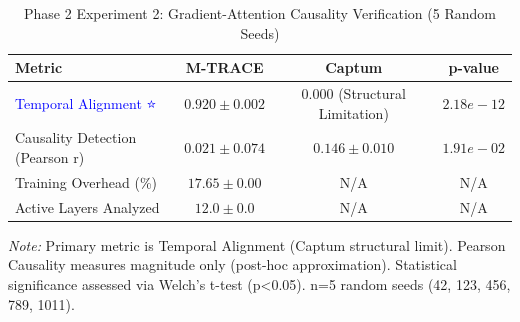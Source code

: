 
\begin{table}[h]
\centering
\caption{Phase 2 Experiment 2: Gradient-Attention Causality Verification (5 Random Seeds)}
\label{tab:experiment2_causality}
\begin{tabular}{lccc}
\toprule
\textbf{Metric} & \textbf{M-TRACE} & \textbf{Captum} & \textbf{p-value} \\
\midrule
\textcolor{blue}{Temporal Alignment ⭐} & $0.920 \pm 0.002$ & $0.000$ (Structural Limitation) & $2.18e-12$ \\ 
\midrule
Causality Detection (Pearson r) & $0.021 \pm 0.074$ & $0.146 \pm 0.010$ & $1.91e-02$ \\
\midrule
Training Overhead (\%) & $17.65 \pm 0.00$ & N/A & N/A \\
\midrule
Active Layers Analyzed & $12.0 \pm 0.0$ & N/A & N/A \\
\bottomrule
\end{tabular}
\begin{flushleft}
\small
\textit{Note:} Primary metric is Temporal Alignment (Captum structural limit).
Pearson Causality measures magnitude only (post-hoc approximation).
Statistical significance assessed via Welch's t-test (p<0.05). 
n=5 random seeds (42, 123, 456, 789, 1011).
\end{flushleft}
\end{table}
